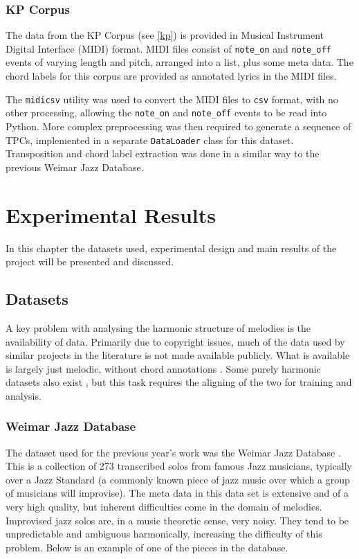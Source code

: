 \documentclass[bsc,singlespacing,logo, parskip, deptreport]{infthesis}
\begin{document}
\subsection{KP Corpus}

The data from the KP Corpus (see \ref{kp}) is provided in Musical Instrument Digital Interface (MIDI) format. MIDI files consist of {\tt note\_on} and {\tt note\_off} events of varying length and pitch, arranged into a list, plus some meta data. The chord labels for this corpus are provided as annotated lyrics in the MIDI files.

The {\tt midicsv} \cite{walker_2008} utility was used to convert the MIDI files to {\tt csv} format, with no other processing, allowing the {\tt note\_on} and {\tt note\_off} events to be read into Python. More complex preprocessing was then required to generate a sequence of TPCs, implemented in a separate {\tt DataLoader} class for this dataset. Transposition and chord label extraction was done in a similar way to the previous Weimar Jazz Database.

\chapter{Experimental Results} \label{Experimental Results}

In this chapter the datasets used, experimental design and main results of the project will be presented and discussed.

\section{Datasets} \label{Datasets}
A key problem with analysing the harmonic structure of melodies is the availability of data. Primarily due to copyright issues, much of the data used by similar projects in the literature is not made available publicly. What is available is largely just melodic, without chord annotations \cite{turetsky2003ground} \cite{MuellerKBA11_SMD_ISMIR-lateBreaking}. Some purely harmonic datasets also exist \cite{burgoyne2011expert} \cite{digiorgi2013automatic}, but this task requires the aligning of the two for training and analysis.

\subsection{Weimar Jazz Database} \label{wjazz}
The dataset used for the previous year's work was the Weimar Jazz Database \cite{wjazz}. This is a collection of 273 transcribed solos from famous Jazz musicians, typically over a Jazz Standard (a commonly known piece of jazz music over which a group of musicians will improvise). The meta data in this data set is extensive and of a very high quality, but inherent difficulties come in the domain of melodies. Improvised jazz solos are, in a music theoretic sense, very noisy. They tend to be unpredictable and ambiguous harmonically, increasing the difficulty of this problem. Below is an example of one of the pieces in the database.
\end{document}
